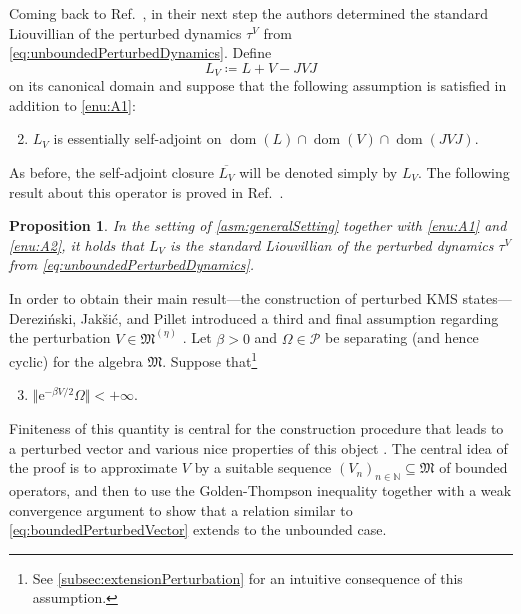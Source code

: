 \documentclass[a4paper, twoside, 11pt, reqno]{amsart}
\theoremstyle{definition}
\theoremstyle{plain}
\newtheorem{proposition}[definition]{Proposition}
\renewcommand{\subset}{\subseteq}
\renewcommand{\Omega}{\varOmega}
\newcommand{\N}{\mathbb{N}}
\newcommand{\MFM}{\mathfrak{M}}
\newcommand{\ee}{\mathrm{e}}
\newcommand{\NPC}{\mathcal{P}}
\renewcommand{\AE}[1]{#1^{(\eta)}}
\newcommand{\1}{\mathbf{1}}
\DeclareMathOperator{\dom}{dom}
\newcommand{\norm}[2][]{#1\Vert{#2}#1\Vert}
\newcommand{\ce}{\coloneqq}
\newcommand{\oln}[1]{\overline{#1}}
\begin{document}
Coming back to Ref.~\cite{DJP03}, in their next step the authors determined the standard Liouvillian of the perturbed dynamics $\tau^V$ from \cref{eq:unboundedPerturbedDynamics}. Define
\begin{equation}\label{eq:perturbedLiouvillian}
    L_V \ce L + V - J V J
\end{equation}
on its canonical domain and suppose that the following assumption \cite[Assumption 3.2]{DJP03} is satisfied in addition to \ref{enu:A1}:
\begin{enumerate}[label=\normalfont\bfseries(A\arabic*), ref=\normalfont(A\arabic*)]
    \setcounter{enumi}{1}
    \item \label{enu:A2} $L_V$ is essentially self-adjoint on $\dom(L) \cap \dom(V) \cap \dom(J V J)$.
\end{enumerate}
As before, the self-adjoint closure $\oln{L_V}$ will be denoted simply by $L_V$. The following result about this operator is proved in Ref.~\cite[Thm. 3.5]{DJP03}.

\begin{proposition}\label{pro:perturbedLiouvillian}
    In the setting of \cref{asm:generalSetting} together with \ref{enu:A1} and \ref{enu:A2}, it holds that $L_V$ is the standard Liouvillian of the perturbed dynamics $\tau^V$ from \cref{eq:unboundedPerturbedDynamics}.
\end{proposition}

In order to obtain their main result---the construction of perturbed KMS states---Derezi\'{n}ski, Jak\v{s}i\'{c}, and Pillet introduced a third and final assumption regarding the perturbation $V \in \AE{\MFM}$ \cite[Assumption 5.1]{DJP03}. Let $\beta > 0$ and $\Omega \in \NPC$ be separating (and hence cyclic) for the algebra $\MFM$. Suppose that\footnote{See \cref{subsec:extensionPerturbation} for an intuitive consequence of this assumption.}
\begin{enumerate}[label=\normalfont\bfseries(A\arabic*), ref=\normalfont(A\arabic*)]
    \setcounter{enumi}{2}
    \item \label{enu:A3} $\norm[\big]{\ee^{- \beta V / 2} \Omega} < + \infty$.
\end{enumerate}
Finiteness of this quantity is central for the construction procedure that leads to a perturbed vector and various nice properties of this object \cite[Thm 5.5]{DJP03}. The central idea of the proof is to approximate $V$ by a suitable sequence $(V_n)_{n \in \N} \subset \MFM$ of bounded operators, and then to use the Golden-Thompson inequality together with a weak convergence argument to show that a relation similar to \cref{eq:boundedPerturbedVector} extends to the unbounded case.
\end{document}
